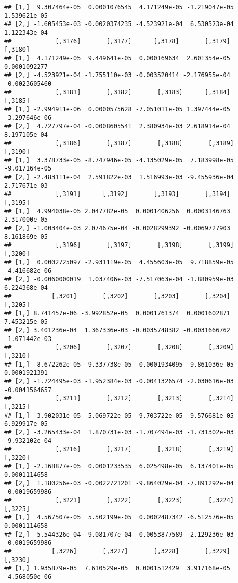 \documentclass[
]{article}
\begin{document}
\begin{verbatim}
## [1,]  9.307464e-05  0.0001076545  4.171249e-05 -1.219047e-05 1.539621e-05
## [2,] -1.605453e-03 -0.0020374235 -4.523921e-04  6.530523e-04 1.122343e-04
##            [,3176]       [,3177]      [,3178]       [,3179]       [,3180]
## [1,]  4.171249e-05  9.449641e-05  0.000169634  2.601354e-05  0.0001092277
## [2,] -4.523921e-04 -1.755110e-03 -0.003520414 -2.176955e-04 -0.0023605460
##            [,3181]       [,3182]       [,3183]      [,3184]       [,3185]
## [1,] -2.994911e-06  0.0000575628 -7.051011e-05 1.397444e-05 -3.297646e-06
## [2,]  4.727797e-04 -0.0008605541  2.380934e-03 2.618914e-04  8.197105e-04
##            [,3186]       [,3187]       [,3188]       [,3189]       [,3190]
## [1,]  3.378733e-05 -8.747946e-05 -4.135029e-05  7.183998e-05 -9.017164e-05
## [2,] -2.483111e-04  2.591822e-03  1.516993e-03 -9.455936e-04  2.717671e-03
##            [,3191]      [,3192]       [,3193]       [,3194]      [,3195]
## [1,]  4.994038e-05 2.047782e-05  0.0001406256  0.0003146763 2.317000e-05
## [2,] -1.003404e-03 2.074675e-04 -0.0028299392 -0.0069727903 8.161869e-05
##            [,3196]       [,3197]       [,3198]       [,3199]       [,3200]
## [1,]  0.0002725097 -2.931119e-05  4.455603e-05  9.718859e-05 -4.416682e-06
## [2,] -0.0060000019  1.037406e-03 -7.517063e-04 -1.880959e-03  6.224368e-04
##           [,3201]       [,3202]       [,3203]       [,3204]       [,3205]
## [1,] 8.741457e-06 -3.992852e-05  0.0001761374  0.0001602871  7.453215e-05
## [2,] 3.401236e-04  1.367336e-03 -0.0035748382 -0.0031666762 -1.071442e-03
##            [,3206]       [,3207]       [,3208]       [,3209]       [,3210]
## [1,]  8.672262e-05  9.337738e-05  0.0001934095  9.861036e-05  0.0001921391
## [2,] -1.724495e-03 -1.952384e-03 -0.0041326574 -2.030616e-03 -0.0041564657
##            [,3211]       [,3212]       [,3213]       [,3214]       [,3215]
## [1,]  3.902031e-05 -5.069722e-05  9.703722e-05  9.576681e-05  6.929917e-05
## [2,] -3.265433e-04  1.870731e-03 -1.707494e-03 -1.731302e-03 -9.932102e-04
##            [,3216]       [,3217]       [,3218]       [,3219]       [,3220]
## [1,] -2.168877e-05  0.0001233535  6.025498e-05  6.137401e-05  0.0001114658
## [2,]  1.180256e-03 -0.0022721201 -9.864029e-04 -7.891292e-04 -0.0019659986
##            [,3221]       [,3222]       [,3223]       [,3224]       [,3225]
## [1,]  4.567507e-05  5.502199e-05  0.0002487342 -6.512576e-05  0.0001114658
## [2,] -5.544326e-04 -9.081707e-04 -0.0053877589  2.129236e-03 -0.0019659986
##           [,3226]       [,3227]       [,3228]       [,3229]       [,3230]
## [1,] 1.935879e-05  7.610529e-05  0.0001512429  3.917168e-05 -4.568050e-06

\end{verbatim}
\end{document}
